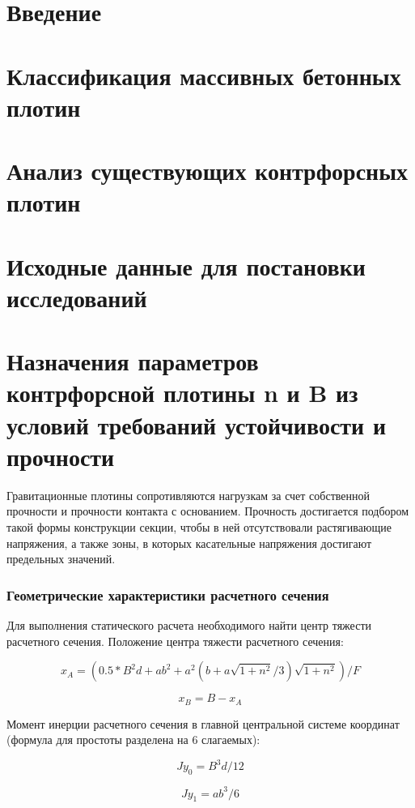 \documentclass[12pt,a4paper,oneside,draft,titlepage]{article}
\begin{document}
\tableofcontents

\part{Введение}

\part{Классификация массивных бетонных плотин}

\part{Анализ существующих контрфорсных плотин}

\part{Исходные данные для постановки исследований}

\part{Назначения параметров контрфорсной плотины n и B из условий требований устойчивости и прочности}

Гравитационные плотины сопротивляются нагрузкам за счет собственной прочности и прочности контакта с основанием. Прочность достигается подбором такой формы конструкции секции, чтобы в ней отсутствовали растягивающие напряжения, а также зоны, в которых касательные напряжения достигают предельных значений.

\section{Геометрические характеристики расчетного сечения}

Для выполнения статического расчета необходимого найти центр тяжести расчетного сечения.
Положение центра тяжести расчетного сечения:

$$ x_A = (0.5 * B ^ 2  d + a  b ^ 2 + a ^ 2  (b + a  \sqrt{1 + n ^ 2} / 3)  \sqrt{1 + n ^ 2}) / F $$

$$ x_B = B - x_A $$

Момент инерции расчетного сечения в главной центральной системе координат (формула для простоты разделена на 6 слагаемых):

$$ Jy_0 = B ^ 3  d / 12 $$

$$ Jy_1 = a  b ^ 3 / 6 $$
\end{document}

